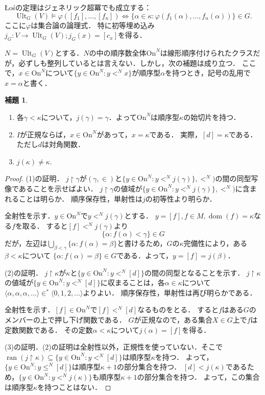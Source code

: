 \documentclass[uplatex]{jsarticle}
\newcommand{\range}{\operatorname{ran}}
\newcommand{\dom}{\operatorname{dom}}
\newcommand{\Ordinals}{\mathrm{On}}
\newcommand{\restrict}{\upharpoonright}
\newcommand{\Ult}{\operatorname{Ult}}
\newcommand{\seq}[1]{{\langle#1\rangle}}
\renewcommand\subset{\subseteq}
\theoremstyle{definition}
\newtheorem{lem}[thm]{補題}
\begin{document}
	Łośの定理はジェネリック超冪でも成立する：
	\[
	\Ult_G(V) \models \varphi([f_1], \dots, [f_n]) \iff \{ \alpha \in \kappa : \varphi(f_1(\alpha), \dots, f_n(\alpha)) \} \in G.
	\]
	ここに$\varphi$は集合論の論理式．
	特に初等埋め込み$j_G \colon V \to \Ult_G(V); j_G(x) = [c_x]$を得る．
	
	$N = \Ult_G(V)$とする．$N$の中の順序数全体$\Ordinals^N$は線形順序付けられたクラスだが，必ずしも整列しているとは言えない．しかし，次の補題は成り立つ．
	ここで，$x \in \Ordinals^N$について$\{ y \in \Ordinals^N : y <^N x \}$が順序型$\alpha$を持つとき，記号の乱用で$x = \alpha$と書く．
	
	\begin{lem}
		\begin{enumerate}
			\item 各$\gamma < \kappa$について，$j(\gamma) = \gamma$．よって$\Ordinals^N$は順序型$\kappa$の始切片を持つ．
			\item $I$が正規ならば，$x \in \Ordinals^N$があって，$x = \kappa$である．
			実際，$[d] = \kappa$である．ただし$d$は対角関数．
			\item $j(\kappa) \ne \kappa$.
		\end{enumerate}
	\end{lem}
	\begin{proof}
		(1)の証明．
		$j \upharpoonright \gamma$が$(\gamma, \in)$と$\{ y \in \Ordinals^N : y <^N j(\gamma)\}, <^N)$の間の同型写像であることを示せばよい．
		$j \upharpoonright \gamma$の値域が$\{ y \in \Ordinals^N : y <^N j(\gamma)\}, <^N)$に含まれることは明らか．
		順序保存性，単射性は$j$の初等性より明らか．
		
		全射性を示す．$y \in \Ordinals^N$で$y <^N j(\gamma)$とする．
		$y = [f], f \in M, \dom(f) = \kappa$なる$f$を取る．
		すると$[f] <^N j(\gamma)$より
		\[
		\{ \alpha : f(\alpha) < \gamma \} \in G
		\]
		だが，左辺は$\bigcup_{\beta < \gamma} \{\alpha : f(\alpha) = \beta \}$と書けるため，$G$の$\kappa$完備性により，ある$\beta < \kappa$について $\{\alpha : f(\alpha) = \beta\} \in G$である．よって，$y = [f] = j(\beta)$．
		
		(2)の証明．
		$j \upharpoonright \kappa$が$\kappa$と$\{ y \in \Ordinals^N : y <^N [d] \}$の間の同型となることを示す．
		$j \upharpoonright \kappa$の値域が$\{ y \in \Ordinals^N : y <^N [d] \}$に収まることは，各$\alpha \in \kappa$について$\seq{\alpha, \alpha, \alpha, \dots} \in^* \seq{0, 1, 2, \dots}$よりよい．
		順序保存性，単射性は再び明らかである．
		
		全射性を示す．$[f] \in \Ordinals^N$で$[f] <^N [d]$なるものをとる．
		すると$f$はある$G$のメンバーの上で押し下げ関数である．
		$G$が正規なので，ある集合$X \in G$上で$f$は定数関数である．
		その定数$\alpha < \kappa$について$j(\alpha) = [f]$を得る．
		
		(3)の証明．(2)の証明は全射性以外，正規性を使っていない．そこで$\range(j \restrict \kappa) \subset \{ y \in \Ordinals^N : y <^N [d] \}$は順序型$\kappa$を持つ．
		よって，$\{ y \in \Ordinals^N : y \le^N [d] \}$は順序型$\kappa + 1$の部分集合を持つ．
		$[d] < j(\kappa)$であるため，$\{ y \in \Ordinals^N : y <^N j(\kappa) \}$も順序型$\kappa + 1$の部分集合を持つ．
		よって，この集合は順序型$\kappa$を持つことはない．
	\end{proof}
	
\end{document}
